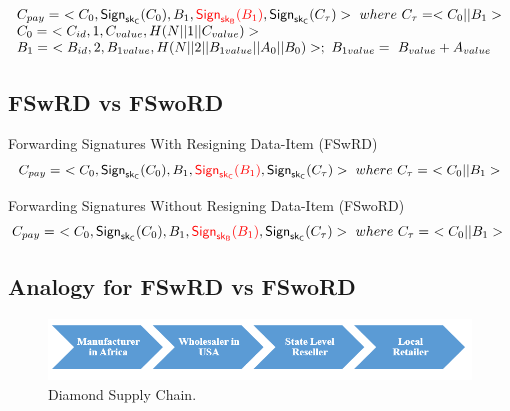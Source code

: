 \documentclass[%
  slidesonly,%
  semlayer%
  ]{seminar}                                  %
\newcommand{\sk}{\sf{sk}}
\begin{document}
\begin{slide}
      \begin{equation*}  
        \begin{array}{l}
          C_{pay} =\ <C_{0},\textsf{Sign}_{\sk_{C}}(C_{0}),B_{1},\textcolor{red}{\textsf{Sign}_{\sk_{B}}(B_{1})}, \textsf{Sign}_{\sk_{C}}(C_{\tau})>\ where\ C_{\tau} = <C_{0} || B_{1}>\\
          C_{0} =\ <C_{id}, 1, C_{value}, H(N||1||C_{value})>\\
          B_{1} =\ <B_{id}, 2, B_{1value}, H(N||2||B_{1value}||A_{0}||B_{0})>;\ B_{1value} =\ B_{value} + A_{value}
        \end{array}
      \end{equation*}
      \vfill
      \clearpage

    \subsection*{FSwRD vs FSwoRD}
      \vfill
      Forwarding Signatures With Resigning Data-Item (FSwRD)
      \begin{equation*}  
        \begin{array}{l}
          C_{pay} =\ <C_{0},\textsf{Sign}_{\sk_{C}}(C_{0}),B_{1},\textcolor{red}{\textsf{Sign}_{\sk_{C}}(B_{1})}, \textsf{Sign}_{\sk_{C}}(C_{\tau})>\ where\ C_{\tau} =\ <C_{0} || B_{1}>\\
        \end{array}
      \end{equation*}

      Forwarding Signatures Without Resigning Data-Item (FSwoRD)
      \begin{equation*}
          C_{pay} =\ <C_{0}, \textsf{Sign}_{\sk_{C}}(C_{0}), B_{1}, \textcolor{red}{\textsf{Sign}_{\sk_{B}}(B_{1})}, \textsf{Sign}_{\sk_{C}}(C_{\tau}) >\ where\ C_{\tau} =\ <C_{0} || B_{1}>\\
      \end{equation*}
      
      \vfill
      \clearpage

    \subsection*{Analogy for FSwRD vs FSwoRD}
      \vfill
      \begin{figure}[h!]
        \centering
        \includegraphics[scale=0.5]{images/diamond-supply-chain.png}
        \caption{Diamond Supply Chain.}
        \label{fig:diamond-supply-chain}
      \end{figure}
      \vfill
      \clearpage


\end{slide}
\end{document}
